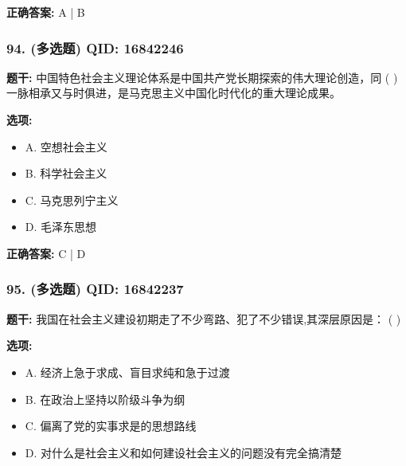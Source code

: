 \documentclass[12pt,UTF8]{ctexart}
\begin{document}
\textbf{正确答案:}
A | B

\vspace{0.3em}\hrulefill\vspace{0.7em}

\subsubsection*{94. (多选题) \small QID: 16842246}

\textbf{题干:}
中国特色社会主义理论体系是中国共产党长期探索的伟大理论创造，同 ( ) 一脉相承又与时俱进，是马克思主义中国化时代化的重大理论成果。

\textbf{选项:}
\begin{itemize}[leftmargin=*]

  \item A. 空想社会主义

  \item B. 科学社会主义

  \item C. 马克思列宁主义

  \item D. 毛泽东思想

\end{itemize}

\textbf{正确答案:}
C | D

\vspace{0.3em}\hrulefill\vspace{0.7em}

\subsubsection*{95. (多选题) \small QID: 16842237}

\textbf{题干:}
我国在社会主义建设初期走了不少弯路、犯了不少错误,其深层原因是： ( )

\textbf{选项:}
\begin{itemize}[leftmargin=*]

  \item A. 经济上急于求成、盲目求纯和急于过渡

  \item B. 在政治上坚持以阶级斗争为纲

  \item C. 偏离了党的实事求是的思想路线

  \item D. 对什么是社会主义和如何建设社会主义的问题没有完全搞清楚

\end{itemize}
\end{document}
